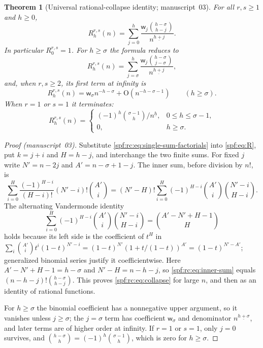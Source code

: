 \documentclass[11pt]{article}
\numberwithin{equation}{section}
\newtheorem{theorem}{Theorem}[section]
\theoremstyle{definition}
\theoremstyle{remark}
\theoremstyle{definition}
\newcommand{\fall}[2]{{#1}^{\underline{#2}}}
\newcommand{\bigO}{\mathrm O}
\newcommand{\rcw}{\mathsf w}
\begin{document}
\begin{theorem}[Universal rational-collapse identity; manuscript~03]
\label{spf:rc:thm:collapse}
For all $r,s\ge1$ and $h\ge0$,
\begin{equation}
 \boxed{\displaystyle
 R_h^{r,s}(n)=\sum_{j=0}^h
       \frac{\rcw_j\binom{h-\sigma}{h-j}}{\fall n{h+j}}.}
 \label{spf:rc:eq:collapse}
\end{equation}
In particular $R_0^{r,s}=1$. For $h\ge\sigma$ the formula reduces to
\begin{equation}
 R_h^{r,s}(n)=\sum_{j=\sigma}^h
       \frac{\rcw_j\binom{h-\sigma}{j-\sigma}}{\fall n{h+j}},
 \label{spf:rc:eq:positive-collapse}
\end{equation}
and, when $r,s\ge2$, its first term at infinity is
\begin{equation}
 R_h^{r,s}(n)=\rcw_\sigma n^{-h-\sigma}+\bigO(n^{-h-\sigma-1})
 \qquad(h\ge\sigma).
 \label{spf:rc:eq:valuation}
\end{equation}
When $r=1$ or $s=1$ it terminates:
\begin{equation}
 R_h^{r,s}(n)=
 \begin{cases}
  (-1)^h\binom{\sigma-1}{h}/\fall nh,&0\le h\le\sigma-1,\\
  0,&h\ge\sigma.
 \end{cases}
 \label{spf:rc:eq:one-path-R}
\end{equation}
\end{theorem}

\begin{proof}[Proof (manuscript~03)]
Substitute \eqref{spf:rc:eq:single-sum-factorials} into \eqref{spf:eq:R},
put $k=j+i$ and $H=h-j$, and interchange the two finite sums. For fixed
$j$ write $N'=n-2j$ and $A'=n-\sigma+1-j$. The inner sum, before division
by $n!$, is
\begin{equation}
 \sum_{i=0}^H\frac{(-1)^{H-i}}{(H-i)!}(N'-i)!\binom{A'}i
 =(N'-H)!\sum_{i=0}^H(-1)^{H-i}\binom{A'}i\binom{N'-i}{H-i}.
 \label{spf:rc:eq:inner-sum}
\end{equation}
The alternating Vandermonde identity
\begin{equation}
 \sum_{i=0}^H(-1)^{H-i}\binom{A'}i\binom{N'-i}{H-i}
       =\binom{A'-N'+H-1}{H}
 \label{spf:rc:eq:alt-vandermonde}
\end{equation}
holds because its left side is the coefficient of $t^H$ in
$\sum_i\binom{A'}it^i(1-t)^{N'-i}=(1-t)^{N'}(1+t/(1-t))^{A'}=(1-t)^{N'-A'}$;
generalized binomial series justify it coefficientwise. Here
$A'-N'+H-1=h-\sigma$ and $N'-H=n-h-j$, so \eqref{spf:rc:eq:inner-sum}
equals $(n-h-j)!\binom{h-\sigma}{h-j}$. This proves
\eqref{spf:rc:eq:collapse} for large $n$, and then as an identity of
rational functions.

For $h\ge\sigma$ the binomial coefficient has a nonnegative upper argument,
so it vanishes unless $j\ge\sigma$; the $j=\sigma$ term has coefficient
$\rcw_\sigma$ and denominator $\fall n{h+\sigma}$, and later terms are of
higher order at infinity. If $r=1$ or $s=1$, only $j=0$ survives, and
$\binom{h-\sigma}h=(-1)^h\binom{\sigma-1}h$, which is zero for $h\ge\sigma$.
\end{proof}
\end{document}
